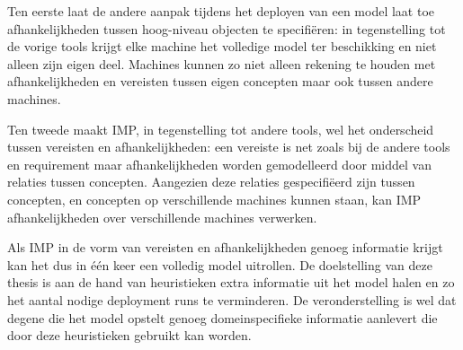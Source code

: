 Ten eerste laat de andere aanpak tijdens het deployen van een model laat toe afhankelijkheden tussen hoog-niveau objecten te specifi\"eren:
in tegenstelling tot de vorige tools krijgt elke machine het volledige model ter beschikking en niet alleen zijn eigen deel.
Machines kunnen zo niet alleen rekening te houden met afhankelijkheden en vereisten tussen eigen concepten maar ook tussen andere machines.

Ten tweede maakt IMP, in tegenstelling tot andere tools, wel het onderscheid tussen vereisten en afhankelijkheden:
een vereiste is net zoals bij de andere tools en requirement maar afhankelijkheden worden gemodelleerd door middel van relaties tussen concepten.
Aangezien deze relaties gespecifi\"eerd zijn tussen concepten, en concepten op verschillende machines kunnen staan, kan IMP afhankelijkheden over verschillende machines verwerken.

Als IMP in de vorm van vereisten en afhankelijkheden genoeg informatie krijgt kan het dus in \'e\'en keer een volledig model uitrollen.
De doelstelling van deze thesis is aan de hand van heuristieken extra informatie uit het model halen en zo het aantal nodige deployment runs te verminderen.
De veronderstelling is wel dat degene die het model opstelt genoeg domeinspecifieke informatie aanlevert die door deze heuristieken gebruikt kan worden.

